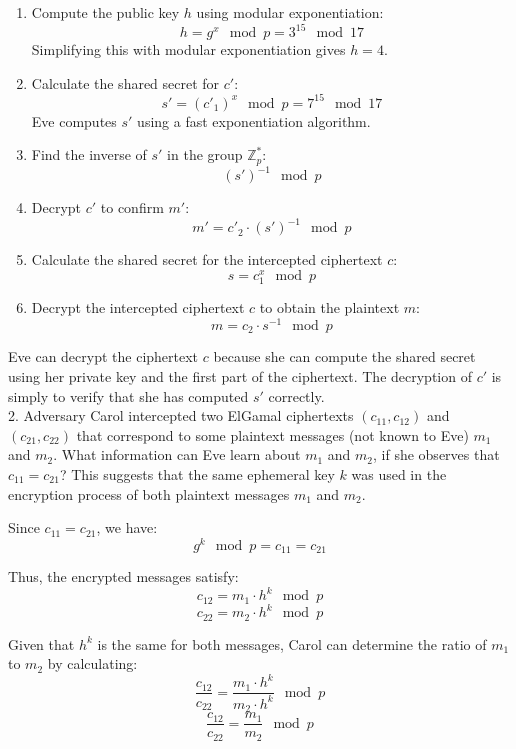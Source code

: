\documentclass{article}
\begin{document}
\begin{enumerate}
    \item Compute the public key \( h \) using modular exponentiation:
    \[ h = g^x \mod p = 3^{15} \mod 17 \]
    Simplifying this with modular exponentiation gives \( h = 4 \).
    \item Calculate the shared secret for \( c' \):
    \[ s' = (c'_1)^x \mod p = 7^{15} \mod 17 \]
    Eve computes \( s' \) using a fast exponentiation algorithm.
    \item Find the inverse of \( s' \) in the group \( \mathbb{Z}_p^* \):
    \[ (s')^{-1} \mod p \]
    \item Decrypt \( c' \) to confirm \( m' \):
    \[ m' = c'_2 \cdot (s')^{-1} \mod p \]
    \item Calculate the shared secret for the intercepted ciphertext \( c \):
    \[ s = c_1^x \mod p \]
    \item Decrypt the intercepted ciphertext \( c \) to obtain the plaintext \( m \):
    \[ m = c_2 \cdot s^{-1} \mod p \]
\end{enumerate}

Eve can decrypt the ciphertext \( c \) because she can compute the shared secret using her private key and the first part of the ciphertext.
The decryption of \( c' \) is simply to verify that she has computed \( s' \) correctly.
\\

2. Adversary Carol intercepted two ElGamal ciphertexts $(c_{11} , c_{12})$ and $(c_{21} , c_{22})$ that correspond to some plaintext messages (not known to Eve) $m_1$ and $m_2$.
What information can Eve learn about $m_1$ and $m_2$, if she observes that $c_{11} = c_{21}$?
This suggests that the same ephemeral key \( k \) was used in the encryption process of both plaintext messages \( m_1 \) and \( m_2 \).

Since \( c_{11} = c_{21} \), we have:
\[ g^k \mod p = c_{11} = c_{21} \]

Thus, the encrypted messages satisfy:
\[ c_{12} = m_1 \cdot h^k \mod p \]
\[ c_{22} = m_2 \cdot h^k \mod p \]

Given that \( h^k \) is the same for both messages, Carol can determine the ratio of \( m_1 \) to \( m_2 \) by calculating:
\[ \frac{c_{12}}{c_{22}} = \frac{m_1 \cdot h^k}{m_2 \cdot h^k} \mod p \]
\[ \frac{c_{12}}{c_{22}} = \frac{m_1}{m_2} \mod p \]
\end{document}
